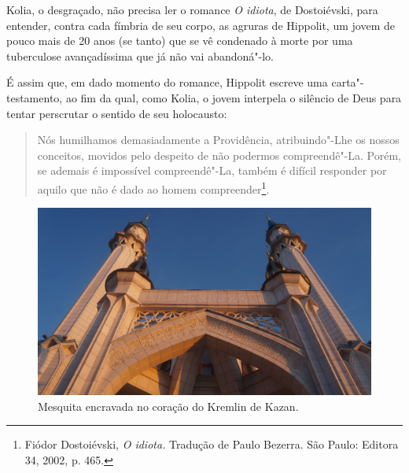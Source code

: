 Kolia, o desgraçado, não precisa ler o romance \emph{O idiota}, de
Dostoiévski, para entender, contra cada fímbria de seu corpo, as agruras
de Hippolit, um jovem de pouco mais de 20 anos (se tanto) que se vê
condenado à morte por uma tuberculose avançadíssima que já não vai
abandoná"-lo.

É assim que, em dado momento do romance, Hippolit escreve uma
carta"-testamento, ao fim da qual, como Kolia, o jovem interpela o
silêncio de Deus para tentar perscrutar o sentido de seu holocausto:

\begin{quote}
Nós humilhamos demasiadamente a Providência, atribuindo"-Lhe os nossos
conceitos, movidos pelo despeito de não podermos compreendê"-La. Porém,
se ademais é impossível compreendê"-La, também é difícil responder por
aquilo que não é dado ao homem compreender\footnote{Fiódor Dostoiévski,
  \emph{O idiota.} Tradução de Paulo Bezerra. São Paulo: Editora 34,
  2002, p. 465.}.
\end{quote}

\clearpage
\thispagestyle{empty}

\movetoevenpage
\begin{absolutelynopagebreak}
\begin{vplace}
\begin{figure}[H]
\begin{adjustwidth}{-1.8cm}{}
  \vspace{2.7cm}
  \includegraphics[width=130mm]{./imgs/kazan2.jpg}  
\end{adjustwidth}
  \caption{Mesquita encravada no coração do Kremlin de Kazan.}

\thispagestyle{empty}

\end{figure}
\end{vplace}

\end{absolutelynopagebreak}


